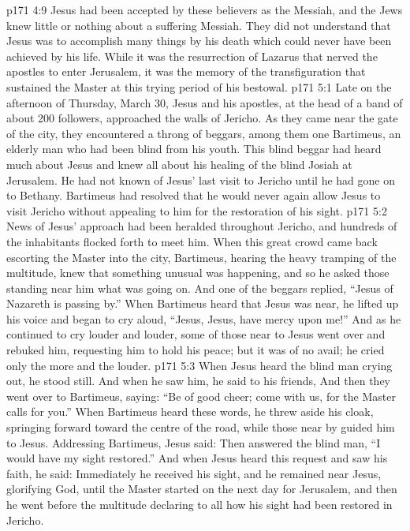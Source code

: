 \vs p171 4:9 Jesus had been accepted by these believers as the Messiah, and the Jews knew little or nothing about a suffering Messiah. They did not understand that Jesus was to accomplish many things by his death which could never have been achieved by his life. While it was the resurrection of Lazarus that nerved the apostles to enter Jerusalem, it was the memory of the transfiguration that sustained the Master at this trying period of his bestowal.
\vs p171 5:1 Late on the afternoon of Thursday, March 30, Jesus and his apostles, at the head of a band of about 200 followers, approached the walls of Jericho. As they came near the gate of the city, they encountered a throng of beggars, among them one Bartimeus, an elderly man who had been blind from his youth. This blind beggar had heard much about Jesus and knew all about his healing of the blind Josiah at Jerusalem. He had not known of Jesus’ last visit to Jericho until he had gone on to Bethany. Bartimeus had resolved that he would never again allow Jesus to visit Jericho without appealing to him for the restoration of his sight.
\vs p171 5:2 News of Jesus’ approach had been heralded throughout Jericho, and hundreds of the inhabitants flocked forth to meet him. When this great crowd came back escorting the Master into the city, Bartimeus, hearing the heavy tramping of the multitude, knew that something unusual was happening, and so he asked those standing near him what was going on. And one of the beggars replied, “Jesus of Nazareth is passing by.” When Bartimeus heard that Jesus was near, he lifted up his voice and began to cry aloud, “Jesus, Jesus, have mercy upon me!” And as he continued to cry louder and louder, some of those near to Jesus went over and rebuked him, requesting him to hold his peace; but it was of no avail; he cried only the more and the louder.
\vs p171 5:3 When Jesus heard the blind man crying out, he stood still. And when he saw him, he said to his friends,  And then they went over to Bartimeus, saying: “Be of good cheer; come with us, for the Master calls for you.” When Bartimeus heard these words, he threw aside his cloak, springing forward toward the centre of the road, while those near by guided him to Jesus. Addressing Bartimeus, Jesus said:  Then answered the blind man, “I would have my sight restored.” And when Jesus heard this request and saw his faith, he said:  Immediately he received his sight, and he remained near Jesus, glorifying God, until the Master started on the next day for Jerusalem, and then he went before the multitude declaring to all how his sight had been restored in Jericho.
